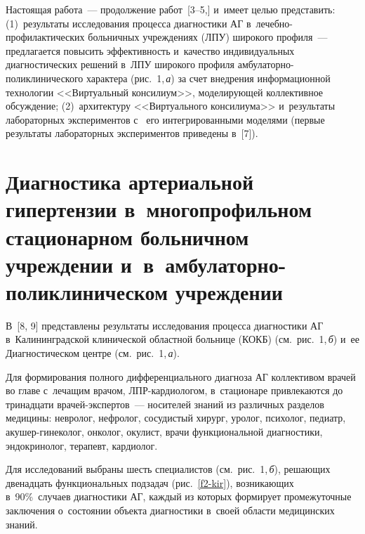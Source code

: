 \begin{multicols}{2}
  \addtocounter{figure}{1}
  
  Настоящая работа~--- продолжение работ~[3--5,] и~имеет целью представить: (1)~результаты 
исследования процесса диагностики АГ  
в~ле\-чеб\-но-про\-фи\-лак\-ти\-че\-ских больничных учреждениях (ЛПУ) широкого 
профиля~--- предлагается повысить эффективность и~качество индивидуальных 
диагностических решений в~ЛПУ широкого профиля ам\-бу\-ла\-тор\-но-по\-ли\-кли\-ни\-че\-ско\-го 
характера (рис.~1,\,\textit{а}) за счет внедрения информационной технологии 
<<Виртуальный консилиум>>, моделирующей коллективное обсуждение; 
(2)~архитектуру <<Виртуального консилиума>> и~результаты лабораторных экспериментов с~
его интегрированными моделями (первые результаты лабораторных экспериментов 
приведены в~[7]).

\section{Диагностика артериальной гипертензии в~многопрофильном 
стационарном больничном учреждении и~в~амбулаторно-поликлиническом 
учреждении}

\vspace*{-9pt}


  В~[8, 9] представлены результаты исследования процесса диагностики 
АГ в~Калининградской клинической областной больнице (КОКБ) 
(см.\ рис.~1,\,\textit{б}) и~ее Диагностическом центре (см.\ рис.~1,\,\textit{а}). 

Для формирования 
полного дифференциального диагноза АГ коллективом врачей во главе с~лечащим врачом, 
ЛПР-кар\-дио\-ло\-гом, в~стационаре привлекаются до тринадцати вра\-чей-экс\-пер\-тов~--- носителей 
знаний из различных разделов медицины: невролог, нефролог, сосудистый хирург, уролог, 
психолог, педиатр, аку\-шер-ги\-не\-ко\-лог, онколог, окулист, врачи функциональной 
диагностики, эндокринолог, терапевт, кардиолог. 

Для исследований выбраны шесть 
специалистов (см.\ рис.~1,\,\textit{б}), решающих двенадцать функциональных подзадач 
(рис.~\ref{f2-kir}), возникающих в~90\%~случаев диагностики АГ, 
каждый из которых формирует промежуточные заключения о~состоянии объекта 
диагностики в~своей области медицинских зна\-ний. 
{

}


\end{multicols}
